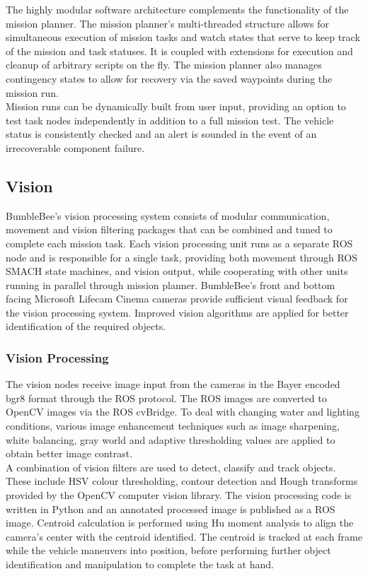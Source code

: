 \documentclass[journal,12pt]{IEEEtran}
\begin{document}
The highly modular software architecture complements the functionality of the mission planner. The mission planner's multi-threaded structure allows for simultaneous execution of mission tasks and watch states that serve to keep track of the mission and task statuses. It is coupled with extensions for execution and cleanup of arbitrary scripts on the fly. The mission planner also manages contingency states to allow for recovery via the saved waypoints during the mission run. \\

Mission runs can be dynamically built from user input, providing an option to test task nodes independently in addition to a full mission test. The vehicle status is consistently checked and an alert is sounded in the event of an irrecoverable component failure. 

\subsection{Vision}
BumbleBee’s vision processing system consists of modular communication, movement and vision filtering packages that can be combined and tuned to complete each mission task. Each vision processing unit runs as a separate ROS node and is responsible for a single task, providing both movement through ROS SMACH state machines, and vision output, while cooperating with other units running in parallel through mission planner. BumbleBee’s front and bottom facing Microsoft Lifecam Cinema cameras provide sufficient visual feedback for the vision processing system. Improved vision algorithms are applied for better identification of the required objects. \\

\subsubsection{Vision Processing}
The vision nodes receive image input from the cameras in the Bayer encoded bgr8 format through the ROS protocol. The ROS images are converted to OpenCV images via the ROS cvBridge. To deal with changing water and lighting conditions, various image enhancement techniques such as image sharpening, white balancing, gray world and adaptive thresholding values are applied to obtain better image contrast. \\

A combination of vision filters are used to detect, classify and track objects. These include HSV colour thresholding, contour detection and Hough transforms provided by the OpenCV computer vision library. The vision processing code is written in Python and an annotated processed image is published as a ROS image. Centroid calculation is performed using Hu moment analysis to align the camera's center with the centroid identified. The centroid is tracked at each frame while the vehicle maneuvers into position, before performing further object identification and manipulation to complete the task at hand. \\
\end{document}
